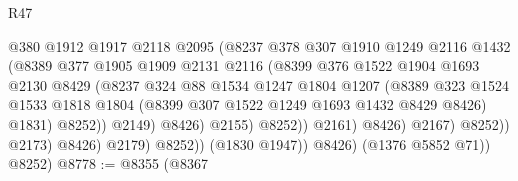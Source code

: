 \begin{lexlean}{R47}
\begin{coremodule}
                                      @380
                                      @1912
                                      @1917
                                      @2118
                                      @2095
                                      (@8237
                                        @378
                                        @307
                                        @1910
                                        @1249
                                        @2116
                                        @1432
                                        (@8389
                                          @377
                                          @1905
                                          @1909
                                          @2131
                                          @2116
                                          (@8399
                                            @376
                                            @1522
                                            @1904
                                            @1693
                                            @2130
                                            @8429
                                            (@8237
                                              @324
                                              @88
                                              @1534
                                              @1247
                                              @1804
                                              @1207
                                              (@8389
                                                @323
                                                @1524
                                                @1533
                                                @1818
                                                @1804
                                                (@8399 @307 @1522 @1249 @1693 @1432 @8429 @8426)
                                                @1831)
                                              @8252))
                                          @2149)
                                        @8426)
                                      @2155)
                                    @8252))
                                @2161)
                              @8426)
                            @2167)
                          @8252))
                      @2173)
                    @8426)
                  @2179)
                @8252))
            (@1830 @1947))
          @8426)
        (@1376 @5852 @71))
      @8252)
@8778 := @8355
    (@8367

\end{coremodule}
\end{lexlean}
